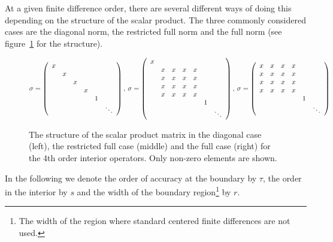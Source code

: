 At a given finite difference order, there are several different ways of doing
this depending on the structure of the scalar product. The three commonly
considered cases are the diagonal norm, the restricted full norm and the full
norm (see figure~\ref{fig:norm} for the structure).
\begin{figure}[t]
\[
\sigma = \left ( \begin{array}{cccccc}
           x &   &   &   &   & \\
             & x &   &   &   & \\
             &   & x &   &   & \\
             &   &   & x &   & \\
             &   &   &   & 1 & \\
             &   &   &   &   & \ddots
         \end{array} \right ),\mbox{\hspace{0.2em}}
\sigma = \left ( \begin{array}{ccccccc}
           x &   &   &   &   &   & \\
             & x & x & x & x &   & \\
             & x & x & x & x &   & \\
             & x & x & x & x &   & \\
             & x & x & x & x &   & \\
             &   &   &   &   & 1 & \\
             &   &   &   &   &   & \ddots
        \end{array} \right ),\mbox{\hspace{0.2em}}
\sigma = \left ( \begin{array}{cccccc}
           x & x & x & x &   & \\
           x & x & x & x &   & \\
           x & x & x & x &   & \\
           x & x & x & x &   & \\
             &   &   &   & 1 & \\
             &   &   &   &   & \ddots
        \end{array} \right )
\]
\caption{The structure of the scalar product matrix in the diagonal case
(left), the restricted full case (middle) and the full case (right) for the
4th order interior operators. Only non-zero elements are shown.}
\label{fig:norm}
\end{figure}

In the following we denote the order of accuracy at the boundary by $\tau$, 
the order in the interior by $s$ and the width of the boundary 
region\footnote{The width of the region where standard centered finite
differences are not used.} by $r$.

